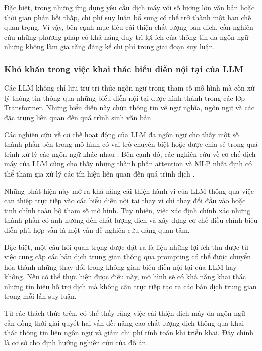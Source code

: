 Đặc biệt, trong những ứng dụng yêu cầu dịch máy với số lượng lớn văn bản hoặc thời gian phản hồi thấp, chi phí suy luận bổ sung có thể trở thành một hạn chế quan trọng. Vì vậy, bên cạnh mục tiêu cải thiện chất lượng bản dịch, cần nghiên cứu những phương pháp có khả năng duy trì lợi ích của thông tin đa ngôn ngữ nhưng không làm gia tăng đáng kể chi phí trong giai đoạn suy luận.

\subsubsection{Khó khăn trong việc khai thác biểu diễn nội tại của LLM}

Các LLM không chỉ lưu trữ tri thức ngôn ngữ trong tham số mô hình mà còn xử lý thông tin thông qua những biểu diễn nội tại được hình thành trong các lớp Transformer. Những biểu diễn này chứa thông tin về ngữ nghĩa, ngôn ngữ và các đặc trưng liên quan đến quá trình sinh văn bản.

Các nghiên cứu về cơ chế hoạt động của LLM đa ngôn ngữ cho thấy một số thành phần bên trong mô hình có vai trò chuyên biệt hoặc được chia sẻ trong quá trình xử lý các ngôn ngữ khác nhau \cite{tang-etal-2024-language,Zhang_Lai_Liu_She_Liu_Gong_Huang_Chen_2026}. Bên cạnh đó, các nghiên cứu về cơ chế dịch máy của LLM cũng cho thấy những thành phần attention và MLP nhất định có thể tham gia xử lý các tín hiệu liên quan đến quá trình dịch \cite{zhang2026exploring}.

Những phát hiện này mở ra khả năng cải thiện hành vi của LLM thông qua việc can thiệp trực tiếp vào các biểu diễn nội tại thay vì chỉ thay đổi đầu vào hoặc tinh chỉnh toàn bộ tham số mô hình. Tuy nhiên, việc xác định chính xác những thành phần có ảnh hưởng đến chất lượng dịch và xây dựng cơ chế điều chỉnh biểu diễn phù hợp vẫn là một vấn đề nghiên cứu đáng quan tâm.

Đặc biệt, một câu hỏi quan trọng được đặt ra là liệu những lợi ích thu được từ việc cung cấp các bản dịch trung gian thông qua prompting có thể được chuyển hóa thành những thay đổi trong không gian biểu diễn nội tại của LLM hay không. Nếu có thể thực hiện được điều này, mô hình sẽ có khả năng khai thác những tín hiệu hỗ trợ dịch mà không cần trực tiếp tạo ra các bản dịch trung gian trong mỗi lần suy luận.

Từ các thách thức trên, có thể thấy rằng việc cải thiện dịch máy đa ngôn ngữ cần đồng thời giải quyết hai vấn đề: nâng cao chất lượng dịch thông qua khai thác thông tin liên ngôn ngữ và giảm chi phí tính toán khi triển khai. Đây chính là cơ sở cho định hướng nghiên cứu của đồ án.

